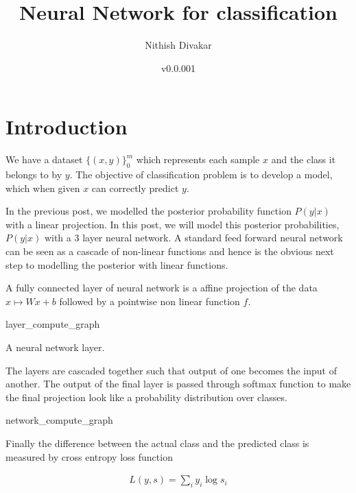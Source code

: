 \documentclass[10pt]{article}
\title{Neural Network for classification}
\author{Nithish Divakar}
\date{v0.0.001}
\begin{document}
\maketitle
\tableofcontents

\section{Introduction}
We have a dataset $\{(x,y)\}_0^m$ which represents each sample $x$ and the class it belongs to by $y$. The objective of classification problem is to develop a model, which when given $x$ can correctly predict $y$. 

In the previous post, we modelled the posterior probability function $P(y|x)$ with a linear projection. 
In this post, we will model this posterior probabilities, $P(y|x)$ with a 3 layer neural network. A standard feed forward neural network can be seen as a cascade of non-linear functions and hence is the obvious next step to modelling the posterior with linear functions. 

A fully connected layer of neural network is a affine projection of the data $x \mapsto Wx+b$ followed by a pointwise non linear function $f$. 

\begin{center}
  {layer_compute_graph} %
\end{center}
\begin{center}
  A neural network layer.
\end{center}


The layers are cascaded together such that output of one becomes the input of another. The output of the final layer is passed through softmax function to make the final projection look like a probability distribution over classes. 

\begin{center}
  {network_compute_graph} %
\end{center}

Finally the difference between the actual class and the predicted class is measured by cross entropy loss function

$$ \begin{aligned}
L(y,s) = \sum_i y_i\log s_i 
\end{aligned} $$
\end{document}
